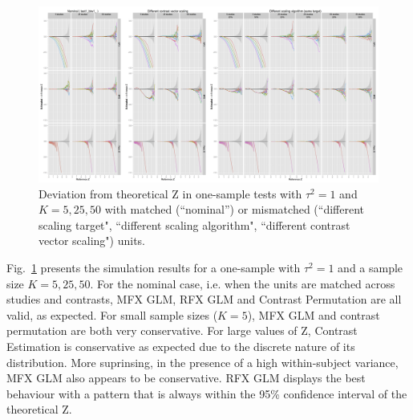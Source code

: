 \documentclass[preprint,12pt]{elsarticle}
\newcommand{\nStudies}{K}
\newcommand{\varBetween}{\tau^2}
\begin{document}
\begin{figure}[t]
	\centering
	\hspace*{-1.5in}
 	\includegraphics[width=1.3\linewidth]{./figures/test1_btw1.png}
	\caption{Deviation from theoretical Z in one-sample tests with $\varBetween=1$ and $\nStudies = 5, 25, 50$ with matched (``nominal'') or mismatched (``different scaling target", ``different scaling algorithm", ``different contrast vector scaling") units.}
	\label{test1_k25_btw1}
\end{figure}

Fig.~\ref{test1_k25_btw1} presents the simulation results for a one-sample with $\varBetween=1$ and a sample size $\nStudies = 5, 25, 50$. For the nominal case, i.e. when the units are matched across studies and contrasts, MFX GLM, RFX GLM and Contrast Permutation are all valid, as expected. For small sample sizes ($\nStudies = 5$), MFX GLM and contrast permutation are both very conservative. For large values of Z, Contrast Estimation is conservative as expected due to the discrete nature of its distribution. More suprinsing, in the presence of a high within-subject variance, MFX GLM also appears to be conservative. RFX GLM displays the best behaviour with a pattern that is always within the 95\% confidence interval of the theoretical Z.

\end{document}
